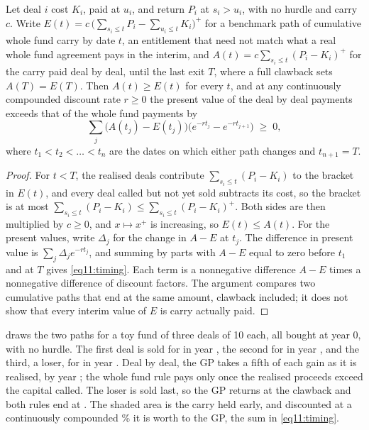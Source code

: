 \begin{chapterrefs}
\begin{proposition}\label{prop11:timing}
Let deal $i$ cost $K_i$, paid at $u_i$, and return $P_i$ at $s_i>u_i$, with no hurdle and carry $c$.
Write $E(t)=c\,\bigl(\sum_{s_i\le t}P_i-\sum_{u_i\le t}K_i\bigr)^+$ for a benchmark path of cumulative whole
fund carry by date $t$, an entitlement that need not match what a real whole fund agreement pays in the
interim, and $A(t)=c\sum_{s_i\le t}(P_i-K_i)^+$ for the carry paid deal by deal, until the last exit $T$,
where a full clawback sets $A(T)=E(T)$. Then $A(t)\ge E(t)$ for every $t$, and at any continuously compounded discount
rate $r\ge0$ the present value of the deal by deal payments exceeds that of the whole fund payments by
\begin{equation}\label{eq11:timing}
  \sum_j\bigl(A(t_j)-E(t_j)\bigr)\bigl(e^{-rt_j}-e^{-rt_{j+1}}\bigr)\;\ge\;0,
\end{equation}
where $t_1<t_2<\dots<t_n$ are the dates on which either path changes and $t_{n+1}=T$.
\end{proposition}

\begin{proof}
For $t<T$, the realised deals contribute $\sum_{s_i\le t}(P_i-K_i)$ to the bracket in $E(t)$, and every
deal called but not yet sold subtracts its cost, so the bracket is at most
$\sum_{s_i\le t}(P_i-K_i)\le\sum_{s_i\le t}(P_i-K_i)^+$. Both sides are then multiplied by $c\ge0$, and
$x\mapsto x^+$ is increasing, so $E(t)\le A(t)$. For the present values, write $\Delta_j$ for the
change in $A-E$ at $t_j$. The difference in present value is $\sum_j\Delta_je^{-rt_j}$, and summing by
parts with $A-E$ equal to zero before $t_1$ and at $T$ gives \cref{eq11:timing}. Each term is a
nonnegative difference $A-E$ times a nonnegative difference of discount factors. The argument compares
two cumulative paths that end at the same amount, clawback included; it does not show that every
interim value of $E$ is carry actually paid.
\end{proof}

 draws the two paths for a toy fund of three deals of 10 each, all bought at year 0, with no hurdle.
The first deal is sold for \ctPOne{} in year \ctSOne, the second for \ctPTwo{} in year \ctSTwo, and the
third, a loser, for \ctPThree{} in year \ctSThree. Deal by deal, the GP takes a fifth of each gain as it is
realised, \ctAPeak{} by year \ctSTwo; the whole fund rule pays only once the realised proceeds exceed the
capital called. The loser is sold last, so the GP returns \ctClaw{} at the clawback and both rules end at
\ctFinal. The shaded area is the carry held early, and discounted at a continuously compounded \ctR\% it is worth \ctPvGap{} to the
GP, the sum in \cref{eq11:timing}.


\end{chapterrefs}
